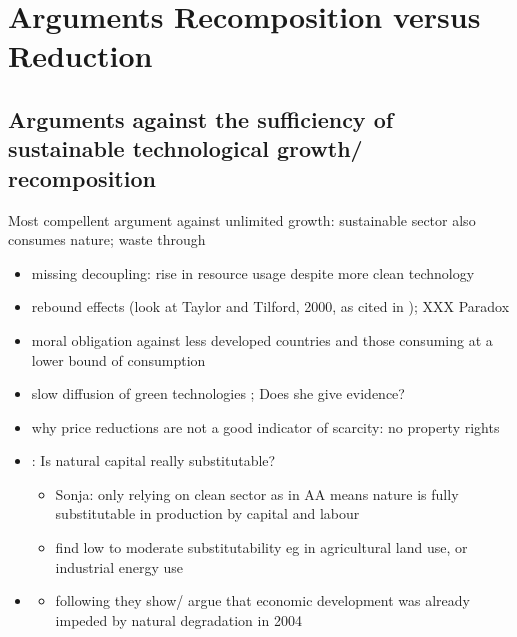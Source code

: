 \documentclass[12pt]{article}
\begin{document}
\section{Arguments Recomposition versus Reduction}
\subsection{Arguments against the sufficiency of sustainable technological growth/ recomposition}
Most compellent argument against unlimited growth: sustainable sector also consumes nature; waste through 
\begin{itemize}
\item missing decoupling: rise in resource usage despite more clean technology \citep{Alexander2012TheContext}
\item rebound effects (look at Taylor and Tilford, 2000, as cited in \cite{Schor2005SustainableReduction}); XXX Paradox \citep{Alexander2012TheContext}
\item moral obligation against less developed countries and those consuming at a lower bound of consumption \citep{Alexander2012TheContext}
\item slow diffusion of green technologies \citep{Schor2005SustainableReduction}; Does she give evidence?
\item why price reductions are not a good indicator of scarcity: no property rights \citep{Schor2005SustainableReduction}
\item \cite{Cohen2019AnnualSubstitutable}: Is natural capital really substitutable?
\begin{itemize}
\item Sonja: only relying on clean sector as in AA means nature is fully substitutable in production by capital and labour
\item find low to moderate substitutability eg in agricultural land use, or industrial energy use
\end{itemize}
\item \cite{Arrow2004AreMuch}
\begin{itemize}
\item following \cite{Cohen2019AnnualSubstitutable} they show/ argue that economic development was already impeded by natural degradation in 2004
\end{itemize}
\end{itemize}
\end{document}
